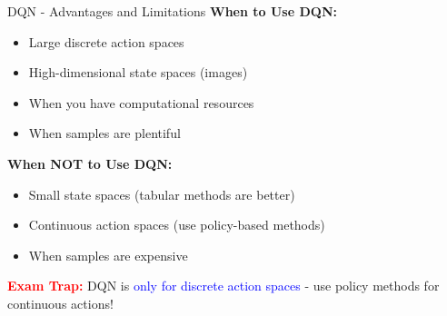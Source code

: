\documentclass[8pt]{beamer}
\begin{document}
\begin{frame}{DQN - Advantages and Limitations}
		\textbf{When to Use DQN:}
		\begin{itemize}
			\item Large discrete action spaces
			\item High-dimensional state spaces (images)
			\item When you have computational resources
			\item When samples are plentiful
		\end{itemize}
		
		\textbf{When NOT to Use DQN:}
		\begin{itemize}
			\item Small state spaces (tabular methods are better)
			\item Continuous action spaces (use policy-based methods)
			\item When samples are expensive
		\end{itemize}
		
		\textcolor{red}{\textbf{Exam Trap:}} DQN is \textcolor{blue}{only for discrete action spaces} - use policy methods for continuous actions!
	\end{frame}
	
\end{document}
